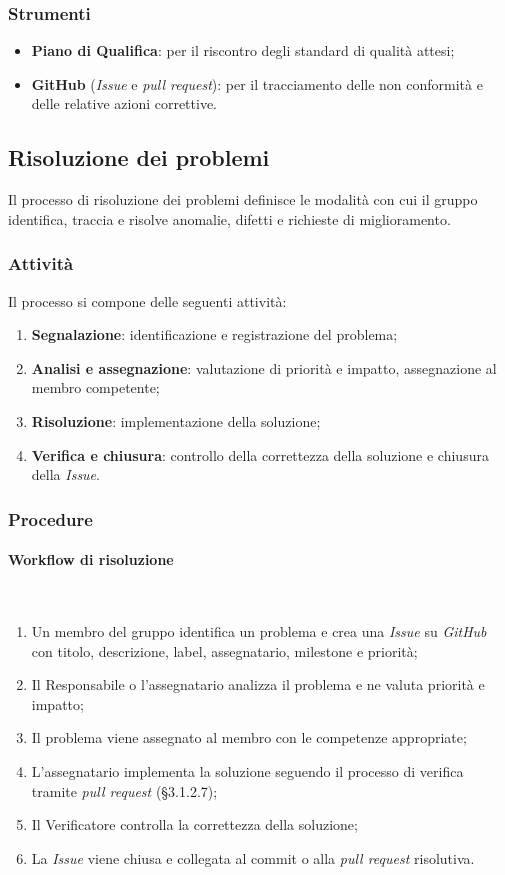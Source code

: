\documentclass[10pt, letterpaper]{article}
\newcommand{\trisubsection}[1]{\paragraph{#1}\mbox{}\\}
\begin{document}
\subsubsection{Strumenti}
\begin{itemize}
    \item \textbf{Piano di Qualifica}: per il riscontro degli standard di qualità attesi;
    \item \textbf{GitHub} (\textit{Issue} e \textit{pull request}): per il tracciamento delle non conformità e delle relative azioni correttive.
\end{itemize}


\subsection{Risoluzione dei problemi}
Il processo di risoluzione dei problemi definisce le modalità con cui il gruppo identifica, traccia e risolve anomalie, difetti e richieste di miglioramento.

\subsubsection{Attività}
Il processo si compone delle seguenti attività:
\begin{enumerate}
    \item \textbf{Segnalazione}: identificazione e registrazione del problema;
    \item \textbf{Analisi e assegnazione}: valutazione di priorità e impatto, assegnazione al membro competente;
    \item \textbf{Risoluzione}: implementazione della soluzione;
    \item \textbf{Verifica e chiusura}: controllo della correttezza della soluzione e chiusura della \textit{Issue}.
\end{enumerate}

\subsubsection{Procedure}

\trisubsection{Workflow di risoluzione}
\begin{enumerate}
    \item Un membro del gruppo identifica un problema e crea una \textit{Issue} su \textit{GitHub} con titolo, descrizione, label, assegnatario, milestone e priorità;
    \item Il Responsabile o l'assegnatario analizza il problema e ne valuta priorità e impatto;
    \item Il problema viene assegnato al membro con le competenze appropriate;
    \item L'assegnatario implementa la soluzione seguendo il processo di verifica tramite \textit{pull request} (§3.1.2.7);
    \item Il Verificatore controlla la correttezza della soluzione;
    \item La \textit{Issue} viene chiusa e collegata al commit o alla \textit{pull request} risolutiva.
\end{enumerate}
\end{document}
